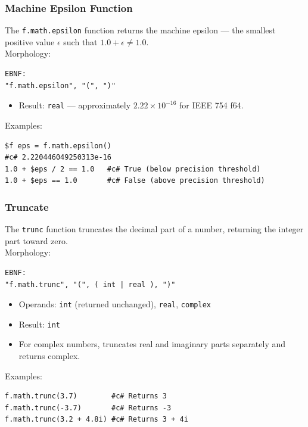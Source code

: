 \subsubsection{Machine Epsilon Function}
The \texttt{f.math.epsilon} function returns the machine epsilon --- the smallest positive value $\epsilon$ such that $1.0 + \epsilon \neq 1.0$. \\
Morphology:
\begin{verbatim}
EBNF:
"f.math.epsilon", "(", ")"
\end{verbatim}
\begin{itemize}
\item Result: \texttt{real} --- approximately $2.22 \times 10^{-16}$ for IEEE 754 f64.
\end{itemize}
Examples:
\begin{verbatim}
$f eps = f.math.epsilon()
#c# 2.220446049250313e-16
1.0 + $eps / 2 == 1.0   #c# True (below precision threshold)
1.0 + $eps == 1.0       #c# False (above precision threshold)
\end{verbatim}

\subsubsection{Truncate}
The \texttt{trunc} function truncates the decimal part of a number, returning the integer part toward zero.\\
Morphology:
\begin{verbatim}
EBNF:
"f.math.trunc", "(", ( int | real ), ")"
\end{verbatim}
\begin{itemize}
\item Operands: \texttt{int} (returned unchanged), \texttt{real}, \texttt{complex}
\item Result: \texttt{int}
\item For complex numbers, truncates real and imaginary parts separately and returns complex.
\end{itemize}
Examples:
\begin{verbatim}
f.math.trunc(3.7)        #c# Returns 3
f.math.trunc(-3.7)       #c# Returns -3
f.math.trunc(3.2 + 4.8i) #c# Returns 3 + 4i
\end{verbatim}

